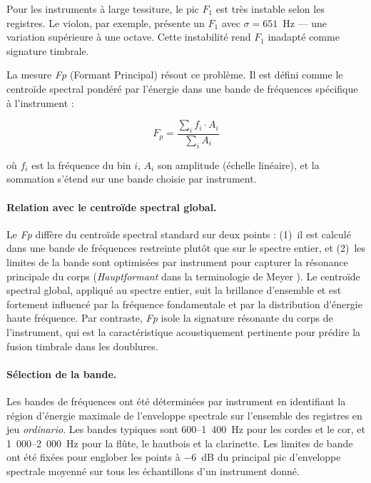 \documentclass[12pt,a4paper]{article}
\begin{document}
Pour les instruments à large tessiture, le pic $F_1$ est très instable selon les
registres. Le violon, par exemple, présente un $F_1$ avec $\sigma = 651$~Hz --- une
variation supérieure à une octave. Cette instabilité rend $F_1$ inadapté comme
signature timbrale.

La mesure \textit{Fp} (Formant Principal) résout ce problème. Il est défini comme
le centroïde spectral pondéré par l'énergie dans une bande de fréquences spécifique
à l'instrument :

\begin{equation}
F_p = \frac{\sum_{i} f_i \cdot A_i}{\sum_{i} A_i}
\label{eq:fp}
\end{equation}

\noindent où $f_i$ est la fréquence du bin $i$, $A_i$ son amplitude (échelle
linéaire), et la sommation s'étend sur une bande choisie par instrument.

\paragraph{Relation avec le centroïde spectral global.}
Le \textit{Fp} diffère du centroïde spectral standard \citep{Peeters2011} sur deux
points : (1)~il est calculé dans une bande de fréquences restreinte plutôt que sur
le spectre entier, et (2)~les limites de la bande sont optimisées par instrument pour
capturer la résonance principale du corps (\emph{Hauptformant} dans la terminologie
de Meyer \citep{Meyer2009}). Le centroïde spectral global, appliqué au spectre entier,
suit la brillance d'ensemble et est fortement influencé par la fréquence fondamentale
et par la distribution d'énergie haute fréquence. Par contraste, \textit{Fp} isole
la signature résonante du corps de l'instrument, qui est la caractéristique
acoustiquement pertinente pour prédire la fusion timbrale dans les doublures.

\paragraph{Sélection de la bande.}
Les bandes de fréquences ont été déterminées par instrument en identifiant la région
d'énergie maximale de l'enveloppe spectrale sur l'ensemble des registres en jeu
\emph{ordinario}. Les bandes typiques sont 600--1~400~Hz pour les cordes et le cor,
et 1~000--2~000~Hz pour la flûte, le hautbois et la clarinette. Les limites de bande
ont été fixées pour englober les points à $-6$~dB du principal pic d'enveloppe
spectrale moyenné sur tous les échantillons d'un instrument donné.
\end{document}
